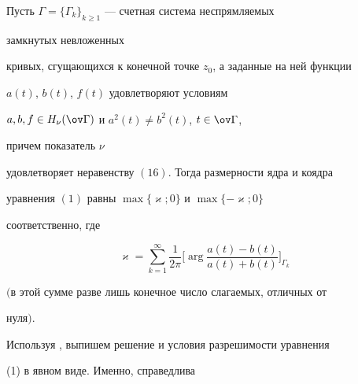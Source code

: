 \begin{thm}


Пусть $\Gamma=\{\Gamma_k\}_{k\ge 1}$ --- счетная система неспрямляемых


замкнутых невложенных


кривых, сгущающихся к конечной точке $z_0$, а заданные на ней функции


$a(t)$, $b(t)$, $f(t)$ удовлетворяют условиям


$a,b,f\in H_\nu(\ov\Gamma)$ и $a^2(t)\ne b^2(t)$, $t\in\ov\Gamma$,


причем показатель $\nu$


удовлетворяет неравенству $(16)$. Тогда размерности ядра и коядра


уравнения $(1)$ равны $\max\{\varkappa;0\}$ и $\max\{-\varkappa;0\}$


соответственно, где


$$


\varkappa=\sum^\infty_{k=1}\frac{1}{2\pi}


\biggl[\arg\frac{a(t)-b(t)}{a(t)+b(t)} \biggr]_{\Gamma_k}


$$


$($в этой сумме разве лишь конечное число слагаемых, отличных от


нуля$)$.


\end{thm}





Используя \cite{11}, выпишем решение и условия разрешимости уравнения


(1) в явном виде. Именно, справедлива





